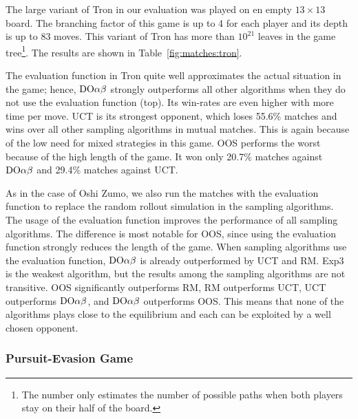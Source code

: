 The large variant of Tron in our evaluation was played on en empty $13\times 13$ board. The branching factor of this game is up to 4 for each player and its depth is up to 83 moves. This variant of Tron has more than $10^{21}$ leaves in the game tree\footnote{The number only estimates the number of possible paths when both players stay on their half of the board.}.
The results are shown in Table~\ref{fig:matches:tron}.

The evaluation function in Tron quite well approximates the actual situation in the game; hence, $\textrm{DO}\alpha\beta$ strongly outperforms all other algorithms when they do not use the evaluation function (top). Its win-rates are even higher with more time per move.
UCT is its strongest opponent, which loses 55.6\% matches and wins over all other sampling algorithms in mutual matches. This is again because of the low need for mixed strategies in this game.
OOS performs the worst because of the high length of the game. It won only 20.7\% matches against $\textrm{DO}\alpha\beta$ and 29.4\% matches against UCT.

As in the case of Oshi Zumo, we also run the matches with the evaluation function to replace the random rollout simulation in the sampling algorithms.
The usage of the evaluation function improves the performance of all sampling algorithms.
The difference is most notable for OOS, since using the evaluation function strongly reduces the length of the game.
When sampling algorithms use the evaluation function, $\textrm{DO}\alpha\beta$ is already outperformed by UCT and RM.
Exp3 is the weakest algorithm, but the results among the sampling algorithms are not transitive.
OOS significantly outperforms RM, RM outperforms UCT, UCT outperforms $\textrm{DO}\alpha\beta$, and $\textrm{DO}\alpha\beta$ outperforms OOS. This means that none of the algorithms plays close to the equilibrium and each can be exploited by a well chosen opponent.

\subsubsection{Pursuit-Evasion Game}

